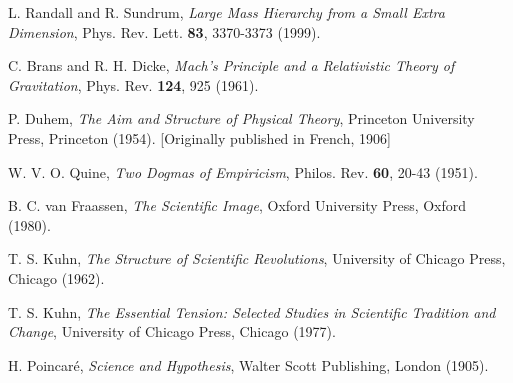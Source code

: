 \documentclass[12pt,a4paper]{article}
\begin{document}
\begin{thebibliography}{99}
		 L. Randall and R. Sundrum, \textit{Large Mass Hierarchy from a Small Extra Dimension}, Phys. Rev. Lett. \textbf{83}, 3370-3373 (1999).
		
		 C. Brans and R. H. Dicke, \textit{Mach's Principle and a Relativistic Theory of Gravitation}, Phys. Rev. \textbf{124}, 925 (1961).
		
		 P. Duhem, \textit{The Aim and Structure of Physical Theory}, Princeton University Press, Princeton (1954). [Originally published in French, 1906]
		
		 W. V. O. Quine, \textit{Two Dogmas of Empiricism}, Philos. Rev. \textbf{60}, 20-43 (1951).
		
		 B. C. van Fraassen, \textit{The Scientific Image}, Oxford University Press, Oxford (1980).
		
		 T. S. Kuhn, \textit{The Structure of Scientific Revolutions}, University of Chicago Press, Chicago (1962).
		
		 T. S. Kuhn, \textit{The Essential Tension: Selected Studies in Scientific Tradition and Change}, University of Chicago Press, Chicago (1977).
		
		 H. Poincaré, \textit{Science and Hypothesis}, Walter Scott Publishing, London (1905).
	\end{thebibliography}
	
\end{document}
